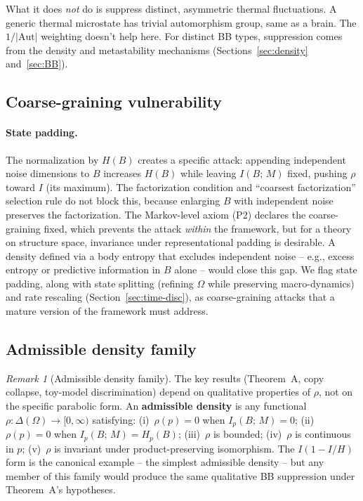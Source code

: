 \documentclass[12pt]{article}
\theoremstyle{remark}
\newtheorem{remark}[theorem]{Remark}
\newcommand{\Aut}{\mathrm{Aut}}
\begin{document}
What it does \emph{not} do is suppress distinct, asymmetric thermal fluctuations. A generic thermal microstate has trivial automorphism group, same as a brain. The $1/|\Aut|$ weighting doesn't help here. For distinct BB types, suppression comes from the density and metastability mechanisms (Sections~\ref{sec:density} and~\ref{sec:BB}).

\subsection{Coarse-graining vulnerability}\label{app:padding}

\paragraph{State padding.} The normalization by $H(B)$ creates a specific attack: appending independent noise dimensions to $B$ increases $H(B)$ while leaving $I(B;\,M)$ fixed, pushing $\rho$ toward $I$ (its maximum). The factorization condition and ``coarsest factorization'' selection rule do not block this, because enlarging $B$ with independent noise preserves the factorization. The Markov-level axiom (P2) declares the coarse-graining fixed, which prevents the attack \emph{within} the framework, but for a theory on structure space, invariance under representational padding is desirable. A density defined via a body entropy that excludes independent noise -- e.g., excess entropy or predictive information in $B$ alone -- would close this gap. We flag state padding, along with state splitting (refining $\Omega$ while preserving macro-dynamics) and rate rescaling (Section~\ref{sec:time-disc}), as coarse-graining attacks that a mature version of the framework must address.

\subsection{Admissible density family}\label{app:admissible}

\begin{remark}[Admissible density family]\label{rem:admissible-app}
The key results (Theorem~A, copy collapse, toy-model discrimination) depend on qualitative properties of $\rho$, not on the specific parabolic form. An \textbf{admissible density} is any functional $\rho\colon \Delta(\Omega) \to [0,\infty)$ satisfying: (i)~$\rho(p) = 0$ when $I_p(B;\,M) = 0$; (ii)~$\rho(p) = 0$ when $I_p(B;\,M) = H_p(B)$; (iii)~$\rho$ is bounded; (iv)~$\rho$ is continuous in $p$; (v)~$\rho$ is invariant under product-preserving isomorphism. The $I(1 - I/H)$ form is the canonical example -- the simplest admissible density -- but any member of this family would produce the same qualitative BB suppression under Theorem~A's hypotheses.
\end{remark}
\end{document}
